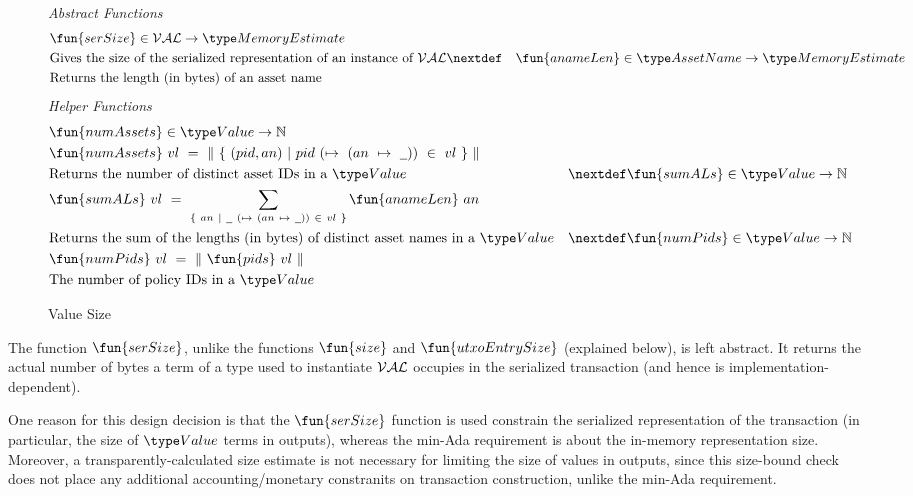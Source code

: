 \begin{figure*}[h]
  \emph{Abstract Functions}
  \begin{align*}
    & \fun{serSize} \in \ValClass \to \MemoryEstimate \\
    & \text{Gives the size of the serialized representation of an instance of $\ValClass$}
    \nextdef
    & \fun{anameLen} \in \AssetName \to \MemoryEstimate \\
    & \text{Returns the length (in bytes) of an asset name}
  \end{align*}
  \emph{Helper Functions}
  \begin{align*}
    & \fun{numAssets} \in \Value \to \N \\
    & \fun{numAssets}~{vl}~=~\|~\{~(pid, an)~\vert~pid~(\mapsto~(an~\mapsto~\wcard))~\in~vl~\}~\| \\
    & \text{Returns the number of distinct asset IDs in a $\Value$}
    & \nextdef
    & \fun{sumALs} \in \Value \to \N \\
    & \fun{sumALs}~{vl}~=~ \sum_{\{~an~\vert~\wcard~(\mapsto~(an~\mapsto~\wcard))~\in~vl~\}} \fun{anameLen}~an \\
    & \text{Returns the sum of the lengths (in bytes) of distinct asset names in a $\Value$}
    & \nextdef
    & \fun{numPids} \in \Value \to \N \\
    & \fun{numPids}~{vl} ~=~ \|~\fun{pids}~{vl}~\| \\
    & \text{The number of policy IDs in a $\Value$}
  \end{align*}
  \caption{Value Size}
  \label{fig:size-helper}
\end{figure*}

The function $\fun{serSize}$, unlike the functions $\fun{size}$ and $\fun{utxoEntrySize}$
    (explained below), is left abstract. It returns the actual number of bytes a term of
    a type used to instantiate $\mathcal{VAL}$
    occupies in the serialized transaction (and hence is implementation-dependent).

    One reason for this design decision is that the $\fun{serSize}$ function is used constrain
    the serialized representation of the transaction (in particular, the size
    of $\Value$ terms in outputs), whereas the min-Ada requirement is about
    the in-memory representation size. Moreover, a transparently-calculated size estimate
    is not necessary for limiting the size of values in outputs, since this size-bound
    check does not place any additional accounting/monetary constranits on transaction construction,
    unlike the min-Ada requirement.

